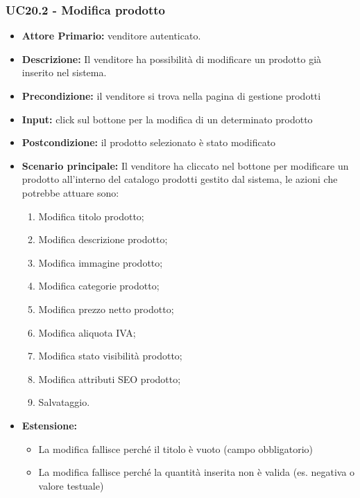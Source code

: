\subsubsection{UC20.2 - Modifica  prodotto}
\label{UC20.2}
\begin{itemize}
    \item \textbf{Attore Primario:}  venditore autenticato.
    \item \textbf{Descrizione:} Il venditore ha possibilità di modificare un prodotto già inserito nel sistema.
    \item \textbf{Precondizione:} il venditore si trova nella pagina di gestione prodotti
    \item \textbf{Input:} click sul bottone per la modifica di un determinato prodotto
    \item \textbf{Postcondizione:} il prodotto selezionato è stato modificato
    \item \textbf{Scenario principale:} Il venditore ha cliccato nel bottone per modificare un prodotto all’interno del catalogo prodotti gestito dal sistema, le azioni che potrebbe attuare sono: 
    \begin{enumerate}
        \item Modifica titolo prodotto;
        \item Modifica descrizione prodotto;
        \item Modifica immagine prodotto;
        \item Modifica categorie prodotto;
        \item Modifica prezzo netto prodotto;
        \item Modifica aliquota IVA;
        \item Modifica stato visibilità prodotto; 
        \item Modifica attributi SEO prodotto;
        \item Salvataggio.
    \end{enumerate}
    \item \textbf{Estensione:}
    \begin{itemize}
        \item La modifica fallisce perché il titolo è vuoto (campo obbligatorio) 
        \item La modifica fallisce perché la quantità inserita non è valida (es. negativa o valore testuale)
    \end{itemize}
\end{itemize}


